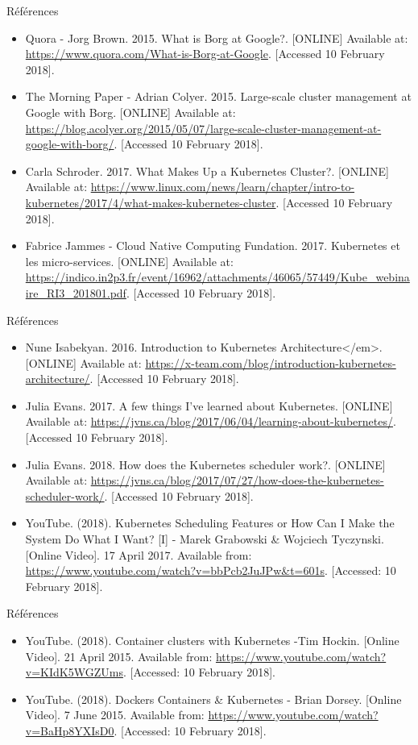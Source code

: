 \documentclass{bredelebeamer}
\begin{document}
\begin{frame}{Références}
\begin{itemize}
\item Quora - Jorg Brown. 2015. What is Borg at Google?. [ONLINE] Available at: \url{https://www.quora.com/What-is-Borg-at-Google}. [Accessed 10 February 2018].
\item The Morning Paper - Adrian Colyer. 2015. Large-scale cluster management at Google with Borg. [ONLINE] Available at: \url{https://blog.acolyer.org/2015/05/07/large-scale-cluster-management-at-google-with-borg/}. [Accessed 10 February 2018].
\item Carla Schroder. 2017. What Makes Up a Kubernetes Cluster?. [ONLINE] Available at: \url{https://www.linux.com/news/learn/chapter/intro-to-kubernetes/2017/4/what-makes-kubernetes-cluster}. [Accessed 10 February 2018].
\item Fabrice Jammes - Cloud Native Computing Fundation. 2017. Kubernetes et les micro-services. [ONLINE] Available at: \url{https://indico.in2p3.fr/event/16962/attachments/46065/57449/Kube_webinaire_RI3_201801.pdf}. [Accessed 10 February 2018].
\end{itemize}
\end{frame}


\begin{frame}{Références}
\begin{itemize}
\item Nune Isabekyan. 2016. Introduction to Kubernetes Architecture</em>. [ONLINE] Available at: \url{https://x-team.com/blog/introduction-kubernetes-architecture/}. [Accessed 10 February 2018].
\item Julia Evans. 2017. A few things I've learned about Kubernetes. [ONLINE] Available at: \url{https://jvns.ca/blog/2017/06/04/learning-about-kubernetes/}. [Accessed 10 February 2018].
\item Julia Evans. 2018. How does the Kubernetes scheduler work?. [ONLINE] Available at: \url{https://jvns.ca/blog/2017/07/27/how-does-the-kubernetes-scheduler-work/}. [Accessed 10 February 2018].
\item YouTube. (2018). Kubernetes Scheduling Features or How Can I Make the System Do What I Want? [I] - Marek Grabowski \& Wojciech Tyczynski. [Online Video]. 17 April 2017. Available from: \url{https://www.youtube.com/watch?v=bbPcb2JuJPw&t=601s}. [Accessed: 10 February 2018].
\end{itemize}
\end{frame}


\begin{frame}{Références}
\begin{itemize}

\item YouTube. (2018). Container clusters with Kubernetes -Tim Hockin. [Online Video]. 21 April 2015. Available from: \url{https://www.youtube.com/watch?v=KIdK5WGZUms}. [Accessed: 10 February 2018].
\item YouTube. (2018). Dockers Containers \& Kubernetes - Brian Dorsey. [Online Video]. 7 June 2015. Available from: \url{https://www.youtube.com/watch?v=BaHp8YXIsD0}. [Accessed: 10 February 2018].
\end{itemize}
\end{frame}
\end{document}
